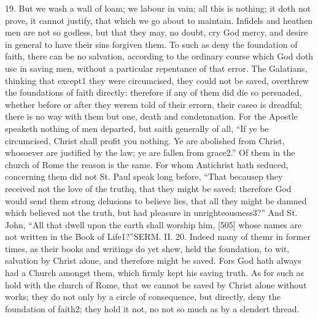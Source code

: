 19. But we wash a wall of loam; we labour in vain; all this is nothing; it doth not prove, it cannot justify, that which we go about to maintain. Infidels and heathen men are not so godless, but that they may, no doubt, cry God mercy, and desire in general to have their sins forgiven them. To such as deny the foundation of faith, there can be no salvation, according to the ordinary course which God doth use in saving men, without a particular repentance of that error. The Galatians, thinking that except1 they were circumcised, they could not be saved, overthrew the foundations of faith directly: therefore if any of them did die so persuaded, whether before or after they werem told of their errorn, their caseo is dreadful; there is no way with them but one, death and condemnation. For the Apostle speaketh nothing of men departed, but saith generally of all, “If ye be circumcised, Christ shall profit you nothing. Ye are abolished from Christ, whosoever are justified by the law; ye are fallen from grace2.” Of them in the church of Rome the reason is the same. For whom Antichrist hath seduced, concerning them did not St. Paul speak long before, “That becausep they received not the love of the truthq, that they might be saved; therefore God would send them strong delusions to believe lies, that all they might be damned which believed not the truth, but had pleasure in unrighteousness3?” And St. John, “All that dwell upon the earth shall worship him, [505] whose names are not written in the Book of Life1?”SERM. II. 20. Indeed many of themr in former times, as their books and writings do yet shew, held the foundation, to wit, salvation by Christ alone, and therefore might be saved. Fors God hath always had a Church amongst them, which firmly kept his saving truth. As for such as hold with the church of Rome, that we cannot be saved by Christ alone without works; they do not only by a circle of consequence, but directly, deny the foundation of faith2; they hold it not, no not so much as by a slendert thread.

